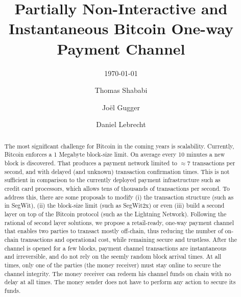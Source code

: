 \documentclass{llncs}
\begin{document}
\title{Partially Non-Interactive and Instantaneous Bitcoin One-way Payment
Channel}

\author{Thomas Shababi \and Jo\"el Gugger \and Daniel Lebrecht}


\subtitle{{\normalsize\today}}


\maketitle

\begin{abstract} The most significant challenge for Bitcoin in the coming years
  is scalability. Currently, Bitcoin enforces a 1 Megabyte block-size limit. On
  average every 10 minutes a new block is discovered. That produces a payment
  network limited to $\approx7$ transactions per second, and with delayed (and
  unknown) transaction confirmation times. This is not sufficient in comparison
  to the currently deployed payment infrastructure such as credit card
  processors, which allows tens of thousands of transactions per second. To
  address this, there are some proposals to modify (i) the transaction structure
  (such as in SegWit), (ii) the block-size limit (such as SegWit2x) or even
  (iii) build a second layer on top of the Bitcoin protocol (such as the
  Lightning Network). Following the rational of second layer solutions, we
  propose a retail-ready, one-way payment channel that enables two parties to
  transact mostly off-chain, thus reducing the number of on-chain transactions
  and operational cost, while remaining secure and trustless. After the channel
  is opened for a few blocks, payment channel transactions are instantaneous and
  irreversible, and do not rely on the seemly random block arrival times. At all
  times, only one of the parties (the money receiver) must stay online to secure
  the channel integrity. The money receiver can redeem his channel funds on
  chain with no delay at all times. The money sender does not have to perform
  any action to secure its funds. 
\end{abstract}
%
\end{document}
